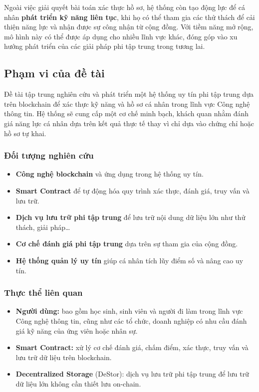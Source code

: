 Ngoài việc giải quyết bài toán xác thực hồ sơ, hệ thống còn tạo động lực để cá nhân \textbf{phát triển kỹ năng liên tục}, khi họ có thể tham gia các thử thách
để cải thiện năng lực và nhận được sự công nhận từ cộng đồng. Với tiềm năng mở rộng, mô hình này có thể được áp dụng cho nhiều lĩnh vực khác,
đóng góp vào xu hướng phát triển của các giải pháp phi tập trung trong tương lai.

\subsection*{\thesubsection\quad Phạm vi của đề tài}

Đề tài tập trung nghiên cứu và phát triển một hệ thống uy tín phi tập trung dựa trên blockchain để xác thực kỹ năng và hồ sơ cá nhân trong lĩnh vực Công nghệ thông tin.
Hệ thống sẽ cung cấp một cơ chế minh bạch, khách quan nhằm đánh giá năng lực cá nhân dựa trên kết quả thực tế thay vì chỉ dựa vào chứng chỉ hoặc hồ sơ tự khai.

\subsubsection*{\thesubsubsection\quad Đối tượng nghiên cứu}
\begin{itemize}
  \item \textbf{Công nghệ blockchain} và ứng dụng trong hệ thống uy tín.
  \item \textbf{Smart Contract} để tự động hóa quy trình xác thực, đánh giá, truy vấn và lưu trữ.
  \item \textbf{Dịch vụ lưu trữ phi tập trung} để lưu trữ nội dung dữ liệu lớn như thử thách, giải pháp\dots
  \item \textbf{Cơ chế đánh giá phi tập trung} dựa trên sự tham gia của cộng đồng.
  \item \textbf{Hệ thống quản lý uy tín} giúp cá nhân tích lũy điểm số và nâng cao uy tín.
\end{itemize}

\subsubsection*{\thesubsubsection\quad Thực thể liên quan}
\begin{itemize}
  \item \textbf{Người dùng:} bao gồm học sinh, sinh viên và người đi làm trong lĩnh vực Công nghệ thông tin, cũng như các tổ chức, doanh nghiệp có nhu cầu đánh giá kỹ năng của ứng viên hoặc nhân sự.
  \item \textbf{Smart Contract:} xử lý cơ chế đánh giá, chấm điểm, xác thực, truy vấn và lưu trữ dữ liệu trên blockchain.
  \item \textbf{Decentralized Storage} (DeStor): dịch vụ lưu trữ phi tập trung để lưu trữ dữ liệu lớn không cần thiết lưu on-chain.
\end{itemize}

